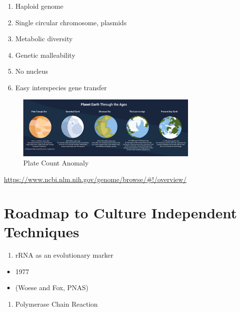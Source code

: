 \documentclass[
]{book}
\providecommand{\tightlist}{%
  \setlength{\itemsep}{0pt}\setlength{\parskip}{0pt}}
\begin{document}
\begin{enumerate}
\def\labelenumi{\arabic{enumi}.}
\tightlist
\item
  Haploid genome
\item
  Single circular chromosome, plasmids
\item
  Metabolic diversity
\item
  Genetic malleability
\item
  No nucleus
\item
  Easy interspecies gene transfer
\end{enumerate}

\begin{figure}
\centering
\includegraphics[width=0.8\textwidth,height=\textheight]{./Figures/Planets.png}
\caption{Plate Count Anomaly}
\end{figure}

\url{https://www.ncbi.nlm.nih.gov/genome/browse/\#!/overview/}

\hypertarget{roadmap-to-culture-independent-techniques}{%
\section{Roadmap to Culture Independent Techniques}\label{roadmap-to-culture-independent-techniques}}

\begin{enumerate}
\def\labelenumi{\arabic{enumi}.}
\tightlist
\item
  rRNA as an evolutionary marker
\end{enumerate}

\begin{itemize}
\tightlist
\item
  1977
\item
  (Woese and Fox, PNAS)
\end{itemize}

\begin{enumerate}
\def\labelenumi{\arabic{enumi}.}
\setcounter{enumi}{1}
\tightlist
\item
  Polymerase Chain Reaction
\end{enumerate}
\end{document}
